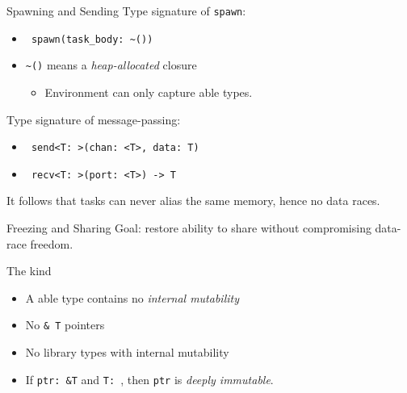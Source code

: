 \documentclass[xcolor=dvipsnames]{beamer}
\begin{document}
\begin{frame}{Spawning and Sending}
        Type signature of \texttt{spawn}:
        \begin{itemize}
                \item \texttt{~spawn(task\_body:~\textasciitilde{}())}
                \item \texttt{\textasciitilde{}()} means a {\em heap-allocated} closure
                \begin{itemize}
                        \item Environment can only capture \texttt{}able types.
                \end{itemize}
        \end{itemize}
        \pause
        \linegap

        Type signature of message-passing:
        \begin{itemize}
		\item \texttt{~send<T:~>(chan:~<T>,~data:~T)}
		\item \texttt{~recv<T:~>(port:~<T>)~->~T}
        \end{itemize}
        \pause
        \linegap
        It follows that tasks can never alias the same memory, hence no data races.
\end{frame}

\begin{frame}{Freezing and Sharing}
        Goal: restore ability to share without compromising data-race freedom.
        \pause
        \linegap

        The \texttt{} kind
	\begin{itemize}
		\item A \texttt{}able type contains no {\em internal mutability}
		\item No \texttt{\&~T} pointers
		\item No library types with internal mutability
		\item If \texttt{ptr:~\&T} and \texttt{T: }, then \texttt{ptr} is {\em deeply immutable}.
	\end{itemize}
\end{frame}
\end{document}
